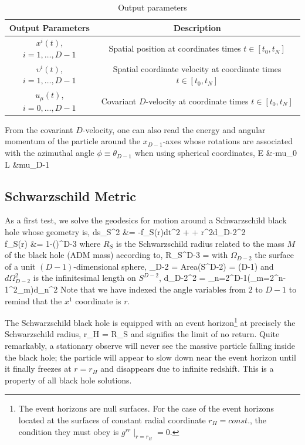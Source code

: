 \begin{table}[H]
	\centering
	\begin{tabular}{|c|c|}
		\hline
		Output Parameters & Description \\
		\hline
		\hline
		$x^{i}(t)$, $i=1,\dots,D-1$ & Spatial position at coordinates times $t\in[t_{0},t_{N}]$ \\
		\hline
		$\upsilon^{i}(t)$, $i=1,\dots,D-1$ & Spatial coordinate velocity at coordinate times $t\in[t_{0},t_{N}]$\\
		\hline
		$u_{\mu}(t)$, $i=0,\dots,D-1$ & Covariant $D$-velocity at coordinate times $t\in[t_{0},t_{N}]$\\
		\hline
	\end{tabular}
	\caption{Output parameters}
	\label{tbl:OUTPUT}
\end{table}

From the covariant $D$-velocity, one can also read the energy and angular momentum of the particle around the $x_{D-1}$-axes whose rotations are associated with the azimuthal angle $\phi \equiv \theta_{D-1}$ when using spherical coordinates,
\be\ba
	E &\equiv -mu_{0} \\
	L &\equiv mu_{D-1}
\ea\ee

\subsection{Schwarzschild Metric}
As a first test, we solve the geodesics for motion around a Schwarzschild black hole whose geometry is,
\be\ba
	ds_{S}^2 &= -f_{S}(r)dt^2 +  + r^2d\Omega_{D-2}^2 \\
	f_{S}(r) &= 1-\left(\right)^{D-3}
\ea\ee
where $R_{S}$ is the Schwarzschild radius related to the mass $M$ of the black hole (ADM mass) according to,
\be
	R_{S}^{D-3} = 
\ee
with $\Omega_{D-2}$ the surface of a unit $(D-1)$-dimensional sphere,
\be
	\Omega_{D-2} = Area(S^{D-2}) = (D-1)
\ee
and $d\Omega_{D-2}^2$ is the infinitesimal length on $S^{D-2}$,
\be
	d\Omega_{D-2}^{2} = \sum_{n=2}^{D-1}\left(\prod_{m=2}^{n-1}\sin^2\theta_{m}\right)d\theta_{n}^2
\ee
Note that we have indexed the angle variables from $2$ to $D-1$ to remind that the $x^1$ coordinate is $r$.

The Schwarzschild black hole is equipped with an event horizon\footnote{The event horizons are null surfaces. For the case of the event horizons located at the surfaces of constant radial coordinate $r_{H} = const.$, the condition they must obey is $g^{rr}\mid_{r=r_{H}}=0$.} at precisely the Schwarzschild radius,
\be
	r_{H} = R_{S}
\ee
and signifies the limit of no return. Quite remarkably, a stationary observe will never see the massive particle falling inside the black hole; the particle will appear to slow down near the event horizon until it finally freezes at $r=r_{H}$ and disappears due to infinite redshift. This is a property of all black hole solutions.

